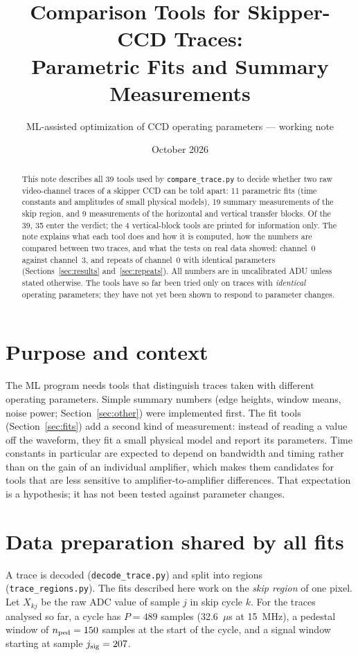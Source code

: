 \documentclass[11pt]{article}
\title{Comparison Tools for Skipper-CCD Traces:\\Parametric Fits and Summary Measurements}
\author{ML-assisted optimization of CCD operating parameters --- working note}
\date{October 2026}
\newcommand{\code}[1]{\texttt{#1}}
\begin{document}
\maketitle

\begin{abstract}
This note describes all 39 tools used by \code{compare\_trace.py} to decide whether two raw
video-channel traces of a skipper CCD can be told apart: 11 parametric fits (time constants and amplitudes
of small physical models), 19 summary measurements of the skip region, and 9 measurements of the horizontal
and vertical transfer blocks. Of the 39, 35 enter the verdict; the 4 vertical-block tools are printed for
information only. The note explains what each tool does and how it is computed, how the numbers are compared
between two traces, and what the tests on real data showed: channel~0 against channel~3, and repeats of channel~0 with identical
parameters (Sections~\ref{sec:results} and~\ref{sec:repeats}). All numbers are in
uncalibrated ADU unless stated otherwise. The tools have so far been tried only on traces with
\emph{identical} operating parameters; they have not yet been shown to respond to parameter changes.
\end{abstract}

\section{Purpose and context}

The ML program needs tools that distinguish traces taken with different operating parameters. Simple
summary numbers (edge heights, window means, noise power; Section~\ref{sec:other}) were implemented first. The fit
tools (Section~\ref{sec:fits}) add a second kind of measurement: instead of reading a value off the waveform, they fit a small physical
model and report its parameters. Time constants in particular are expected to depend on bandwidth and
timing rather than on the gain of an individual amplifier, which makes them candidates for tools that
are less sensitive to amplifier-to-amplifier differences. That expectation is a hypothesis; it has not
been tested against parameter changes.

\section{Data preparation shared by all fits}

A trace is decoded (\code{decode\_trace.py}) and split into regions (\code{trace\_regions.py}). The fits
described here work on the \emph{skip region} of one pixel. Let $X_{kj}$ be the raw ADC value of sample
$j$ in skip cycle $k$. For the traces analysed so far, a cycle has $P=489$ samples (32.6~$\mu$s at
15~MHz), a pedestal window of $n_{\rm ped}=150$ samples at the start of the cycle, and a signal window
starting at sample $j_{\rm sig}=207$.
\end{document}
